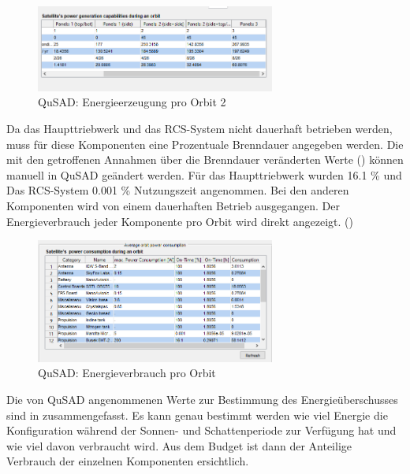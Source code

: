 			\begin{figure}[H]
				\centering
					\includegraphics[width=0.70\textwidth]{graphics/power4.PNG}
				\caption{QuSAD: Energieerzeugung pro Orbit 2}
				\label{fig:power4}
			\end{figure}
Da das Haupttriebwerk und das RCS-System nicht dauerhaft betrieben werden, muss für diese Komponenten eine Prozentuale Brenndauer angegeben werden. Die mit den getroffenen Annahmen über die Brenndauer veränderten Werte  () können manuell in QuSAD geändert werden. Für das Haupttriebwerk wurden \num{16,1} \% und Das RCS-System \num{0,001} \% Nutzungszeit angenommen. Bei den anderen Komponenten wird von einem dauerhaften Betrieb ausgegangen. Der Energieverbrauch jeder Komponente pro Orbit wird direkt angezeigt. ()
			
			\begin{figure}[H]
				\centering
					\includegraphics[width=0.70\textwidth]{graphics/power5.png}
				\caption{QuSAD: Energieverbrauch pro Orbit}
				\label{fig:power5}
			\end{figure}
Die von QuSAD angenommenen Werte zur Bestimmung des Energieüberschusses sind in   zusammengefasst. Es kann genau bestimmt werden wie viel Energie die Konfiguration während der Sonnen- und Schattenperiode zur Verfügung hat und wie viel davon verbraucht wird. Aus dem Budget ist dann der Anteilige Verbrauch der 
einzelnen Komponenten ersichtlich.

